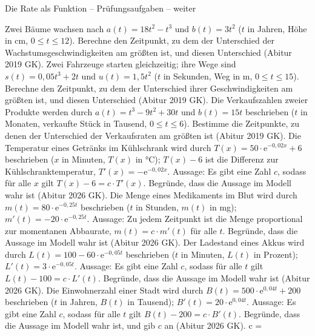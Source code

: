 \begin{aufgabe}{Die Rate als Funktion – Prüfungsaufgaben – weiter}
\begin{teile}
\teil Zwei Bäume wachsen nach $a(t) = 18t^2 - t^3$ und $b(t) = 3t^2$ ($t$ in Jahren, Höhe in cm, $0 \le t \le 12$). Berechne den Zeitpunkt, zu dem der Unterschied der Wachstumsgeschwindigkeiten am größten ist, und diesen Unterschied \hfill (Abitur 2019 GK).
\teil Zwei Fahrzeuge starten gleichzeitig; ihre Wege sind $s(t) = 0{,}05t^3 + 2t$ und $u(t) = 1{,}5t^2$ ($t$ in Sekunden, Weg in m, $0 \le t \le 15$). Berechne den Zeitpunkt, zu dem der Unterschied ihrer Geschwindigkeiten am größten ist, und diesen Unterschied \hfill (Abitur 2019 GK).
\teil Die Verkaufszahlen zweier Produkte werden durch $a(t) = t^3 - 9t^2 + 30t$ und $b(t) = 15t$ beschrieben ($t$ in Monaten, verkaufte Stück in Tausend, $0 \le t \le 6$). Bestimme die Zeitpunkte, zu denen der Unterschied der Verkaufsraten am größten ist \hfill (Abitur 2019 GK).
\teil Die Temperatur eines Getränks im Kühlschrank wird durch $T(x) = 50 \cdot \mathrm{e}^{-0{,}02x} + 6$ beschrieben ($x$ in Minuten, $T(x)$ in °C); $T(x) - 6$ ist die Differenz zur Kühlschranktemperatur, $T'(x) = -\mathrm{e}^{-0{,}02x}$. Aussage: Es gibt eine Zahl $c$, sodass für alle $x$ gilt $T(x) - 6 = c \cdot T'(x)$. Begründe, dass die Aussage im Modell wahr ist \hfill (Abitur 2026 GK).
\teil Die Menge eines Medikaments im Blut wird durch $m(t) = 80 \cdot \mathrm{e}^{-0{,}25t}$ beschrieben ($t$ in Stunden, $m(t)$ in mg); $m'(t) = -20 \cdot \mathrm{e}^{-0{,}25t}$. Aussage: Zu jedem Zeitpunkt ist die Menge proportional zur momentanen Abbaurate, $m(t) = c \cdot m'(t)$ für alle $t$. Begründe, dass die Aussage im Modell wahr ist \hfill (Abitur 2026 GK).
\teil Der Ladestand eines Akkus wird durch $L(t) = 100 - 60 \cdot \mathrm{e}^{-0{,}05t}$ beschrieben ($t$ in Minuten, $L(t)$ in Prozent); $L'(t) = 3 \cdot \mathrm{e}^{-0{,}05t}$. Aussage: Es gibt eine Zahl $c$, sodass für alle $t$ gilt $L(t) - 100 = c \cdot L'(t)$. Begründe, dass die Aussage im Modell wahr ist \hfill (Abitur 2026 GK).
\teil Die Einwohnerzahl einer Stadt wird durch $B(t) = 500 \cdot \mathrm{e}^{0{,}04t} + 200$ beschrieben ($t$ in Jahren, $B(t)$ in Tausend); $B'(t) = 20 \cdot \mathrm{e}^{0{,}04t}$. Aussage: Es gibt eine Zahl $c$, sodass für alle $t$ gilt $B(t) - 200 = c \cdot B'(t)$. Begründe, dass die Aussage im Modell wahr ist, und gib $c$ an \hfill (Abitur 2026 GK). c = \leerfeld
\end{teile}
\end{aufgabe}
